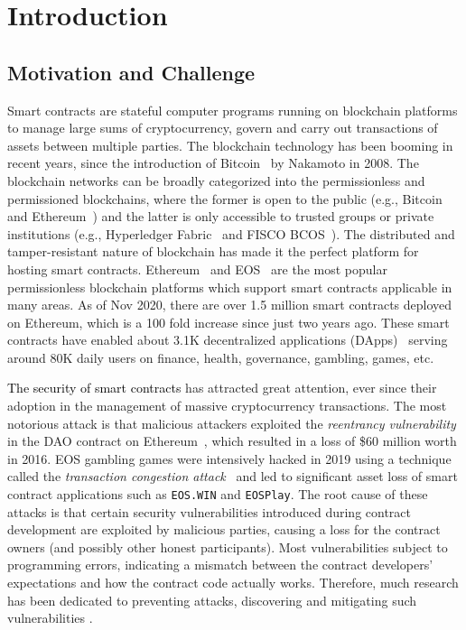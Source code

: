 
\chapter{Introduction} %
\label{ch:introduction} %
\section{Motivation and Challenge}
Smart contracts are stateful computer programs running on blockchain platforms to manage large sums of
cryptocurrency, govern and carry out transactions of assets between multiple parties.
The blockchain technology has been booming in recent years, since the introduction of Bitcoin~\cite{nakamoto2008bitcoin} by Nakamoto in 2008.
The blockchain networks can be broadly categorized into the permissionless and permissioned blockchains, where the former is open to the public (e.g.,
Bitcoin~\cite{nakamoto2008bitcoin} and Ethereum~\cite{Ethereum}) and the latter is only accessible to trusted groups or private institutions (e.g., Hyperledger Fabric~\cite{hyperledger-fabric} and FISCO BCOS~\cite{fisco}).
The distributed and tamper-resistant nature of blockchain has made it the perfect platform for hosting smart contracts.
Ethereum~\cite{Ethereum} and EOS~\cite{EOS} are the most popular permissionless blockchain platforms which
support smart contracts applicable in many areas.
As of Nov 2020, there are over 1.5 million smart contracts deployed on Ethereum, which is a 100 fold increase since just two years ago.
These smart contracts have enabled about 3.1K decentralized applications (DApps)~\cite{dapp-stats}
serving around 80K daily users on finance, health, governance, gambling, games, etc.


\textcolor{black}{The security of smart contracts} has attracted great attention, ever since their adoption in the management of massive cryptocurrency transactions.
The most notorious attack is that malicious attackers exploited the \emph{reentrancy vulnerability} in the DAO contract on Ethereum~\cite{DAO_attacks}, which resulted in
a loss of \$60 million worth in 2016.
EOS gambling games were intensively hacked in 2019 using a technique called the \emph{transaction congestion attack}~\cite{EOS_attacks} and led
to significant asset loss of smart contract applications such as \texttt{EOS.WIN} and \texttt{EOSPlay}.
The root cause of these attacks is that certain security vulnerabilities introduced during contract development are exploited by malicious parties, causing a loss for the contract owners (and possibly other honest participants).
Most vulnerabilities subject to programming errors, indicating a mismatch between the contract developers' expectations and how the contract code actually works.
Therefore, much research has been dedicated to preventing attacks, discovering and mitigating such vulnerabilities .


